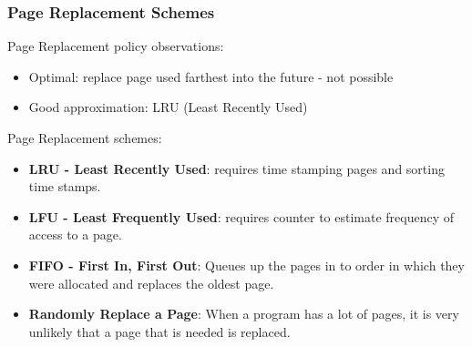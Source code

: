 \begin{frame}[fragile]\frametitle{Page Replacement Schemes}
Page Replacement policy observations:
\begin{itemize}
\item Optimal: replace page used farthest into the future - not possible
\item Good approximation: LRU (Least Recently Used)
\end{itemize}
Page Replacement schemes:
\begin{itemize}
\item \textbf{LRU - Least Recently Used}: requires time stamping pages and sorting time stamps.
\item \textbf{LFU - Least Frequently Used}: requires counter to estimate frequency of access to a page.

\item \textbf{FIFO - First In, First Out}: Queues up the pages in to order in which they were allocated and replaces the oldest page. 

\item \textbf{Randomly Replace a Page}: When a program has a lot of pages, it is very unlikely that a page that is needed is replaced.
\end{itemize}
\end{frame}

